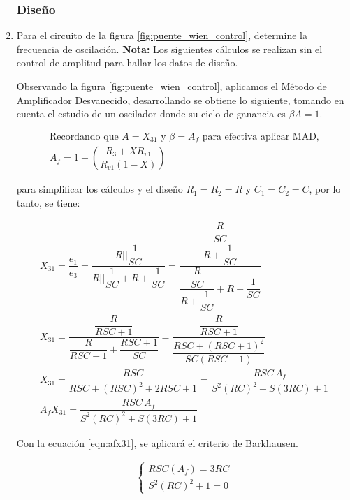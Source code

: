         
    \begin{enumerate}
    
        \subsubsection{Diseño} 
        
        \item Para el circuito de la figura \ref{fig:puente_wien_control}, determine la frecuencia de oscilación.
            \textbf{Nota:} Los siguientes cálculos se realizan sin el control de amplitud para hallar los datos de diseño.
            
            Observando la figura \ref{fig:puente_wien_control}, aplicamos el Método de Amplificador Desvanecido, desarrollando se obtiene lo siguiente, tomando en cuenta el estudio de un oscilador donde su ciclo de ganancia es $\beta A = 1$.

            \begin{gather}
                \text{Recordando que $A=X_{31}$ y $\beta = A_f$ para efectiva aplicar MAD,}\nonumber\\[0.5cm]
                A_f=1+\left(\dfrac{R_3+XR_{v1}}{R_{v1}(1-X)}\right) \label{eqn:af} 
            \end{gather}

            para simplificar los cálculos y el diseño $R_1=R_2=R$ y $C_1=C_2=C$, por lo tanto, se tiene:
            
            \begin{gather}
                X_{31}=\dfrac{e_1}{e_3}=\dfrac{R||\dfrac{1}{SC}}{R||\dfrac{1}{SC}+R+\dfrac{1}{SC}}=\dfrac{\dfrac{\dfrac{R}{SC}}{R+\dfrac{1}{SC}}}{\dfrac{\dfrac{R}{SC}}{R+\dfrac{1}{SC}}+R+\dfrac{1}{SC}}\nonumber \\[0.5cm]
                X_{31}=\dfrac{\dfrac{R}{RSC+1}}{\dfrac{R}{RSC+1}+\dfrac{RSC+1}{SC}}=\dfrac{\dfrac{R}{RSC+1}}{\dfrac{RSC+(RSC+1)^2}{SC(RSC+1)}}\nonumber \\[0.5cm]
                X_{31}=\dfrac{RSC}{RSC+(RSC)^2+2RSC+1}=\dfrac{RSC \, A_f}{S^2(RC)^2+S(3RC)+1}  \nonumber \\[0.5cm]
                A_fX_{31}=\dfrac{RSC \, A_f}{S^2(RC)^2+S(3RC)+1} \label{eqn:afx31}
            \end{gather}

            Con la ecuación \ref{eqn:afx31}, se aplicará el criterio de Barkhausen.

            \begin{align}
                \begin{cases}
                    RSC(A_f)=3RC \\[0.5cm]
                    S^2(RC)^2+1=0 
                \end{cases}
                \label{eqn:1}
            \end{align}


\end{enumerate}
